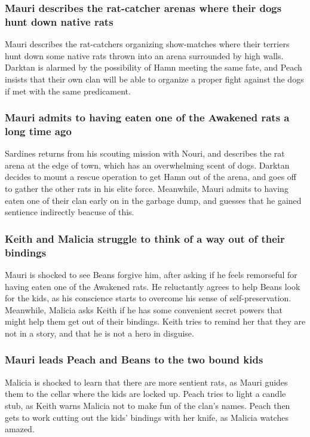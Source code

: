\subsubsection{\Gls{Mauri} describes the rat-catcher arenas where their dogs hunt down native rats}
\Gls{Mauri} describes the rat-catchers organizing show-matches where their terriers hunt down some
native rats thrown into an arena surrounded by high walls. \Gls{Darktan} is alarmed by the
possibility of \Gls{Hamn} meeting the same fate, and \Gls{Peach} insists that their own clan will be
able to organize a proper fight against the dogs if met with the same predicament.

\subsubsection{\Gls{Mauri} admits to having eaten one of the Awakened rats a long time ago}
\Gls{Sardines} returns from his scouting mission with \Gls{Nouri}, and describes the rat arena at
the edge of town, which has an overwhelming scent of dogs. \Gls{Darktan} decides to mount a rescue
operation to get \Gls{Hamn} out of the arena, and goes off to gather the other rats in his elite
force. Meanwhile, \Gls{Mauri} admits to having eaten one of their clan early on in the garbage dump,
and guesses that he gained sentience indirectly beacuse of this.

\subsubsection{\Gls{Keith} and \Gls{Malicia} struggle to think of a way out of their bindings}
\Gls{Mauri} is shocked to see \Gls{Beans} forgive him, after asking if he feels remorseful for
having eaten one of the Awakened rats. He reluctantly agrees to help \Gls{Beans} look for the kids,
as his conscience starts to overcome his sense of self-preservation. Meanwhile, \Gls{Malicia} asks
\Gls{Keith} if he has some convenient secret powers that might help them get out of their bindings.
\Gls{Keith} tries to remind her that they are not in a story, and that he is not a hero in disguise.

\subsubsection{\Gls{Mauri} leads \Gls{Peach} and \Gls{Beans} to the two bound kids}
\Gls{Malicia} is shocked to learn that there are more sentient rats, as \Gls{Mauri} guides them to
the cellar where the kids are locked up. \Gls{Peach} tries to light a candle stub, as \Gls{Keith}
warns \Gls{Malicia} not to make fun of the clan's names. \Gls{Peach} then gets to work cutting out
the kids' bindings with her knife, as \Gls{Malicia} watches amazed.

